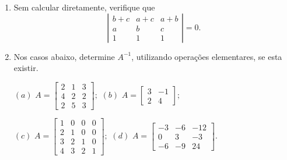 \documentclass{report}
\begin{document}
\begin{Exercise}
\begin{enumerate}

\item \label{1lista38}   Sem calcular diretamente, verifique que
\begin{equation*}
\left|
\begin{array}{ccc}
b+c & a+c & a+b \\
a & b & c \\
1 & 1 & 1
\end{array}
\right| =0.
\end{equation*}




\item \label{1lista39} Nos casos abaixo, determine $A^{-1}$,
utilizando operações elementares, se esta existir.

\medskip

$(a)$ $A=\left[
\begin{array}{rrr}
2 & 1 & 3 \\
4 & 2 & 2 \\
2 & 5 & 3
\end{array}
\right];$ \hspace{2cm} $(b)$ $A=\left[
\begin{array}{rr}
3 & -1 \\
2 & 4
\end{array}
\right];$

\bigskip

$(c)$ $A=\left[
\begin{array}{rrrr}
1 & 0 & 0 & 0 \\
2 & 1 & 0 & 0 \\
3 & 2 & 1 & 0 \\
4 & 3 & 2 & 1
\end{array}
\right];$  \hspace{1.5cm}  $(d)$ $A=\left[
\begin{array}{rrr}
-3 & -6 & -12 \\
0 & 3 & -3 \\
-6 & -9 & 24
\end{array}
\right].$




\end{enumerate}
\end{Exercise}
\end{document}

